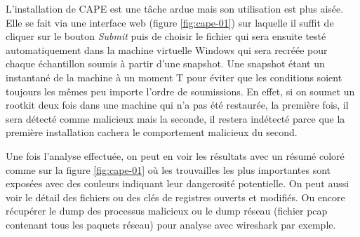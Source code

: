 
\newpage

L'installation de CAPE est une tâche ardue mais son utilisation est plus aisée. Elle se fait via une interface web (figure \ref{fig:cape-01}) sur laquelle il suffit de cliquer sur le bouton \textit{Submit} puis de choisir le fichier qui sera ensuite testé automatiquement dans la machine virtuelle Windows qui sera recréée pour chaque échantillon soumis à partir d'une snapshot. Une snapshot étant un instantané de la machine à un moment T pour éviter que les conditions soient toujours les mêmes peu importe l'ordre de soumissions. En effet, si on soumet un rootkit deux fois dans une machine qui n'a pas été restaurée, la première fois, il sera détecté comme malicieux mais la seconde, il restera indétecté parce que la première installation cachera le comportement malicieux du second.

Une fois l'analyse effectuée, on peut en voir les résultats avec un résumé coloré comme sur la figure \ref{fig:cape-01} où les trouvailles les plus importantes sont exposées avec des couleurs indiquant leur dangerosité potentielle. On peut aussi voir le détail des fichiers ou des clés de registres ouverts et modifiés. Ou encore récupérer le dump des processus malicieux ou le dump réseau (fichier pcap contenant tous les paquets réseau) pour analyse avec wireshark par exemple.

